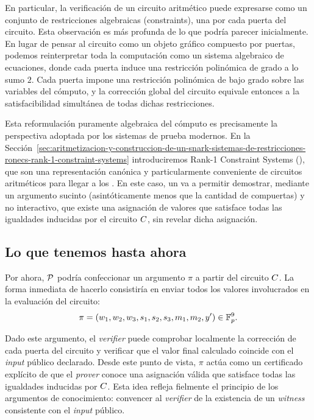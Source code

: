 En particular, la verificación de un circuito aritmético puede expresarse como un conjunto de restricciones algebraicas (constraints), una por cada puerta del circuito. Esta observación es más profunda de lo que podría parecer inicialmente. En lugar de pensar al circuito como un objeto gráfico compuesto por puertas, podemos reinterpretar toda la computación como un sistema algebraico de ecuaciones, donde cada puerta induce una restricción polinómica de grado a lo sumo $2$. Cada puerta impone una restricción polinómica de bajo grado sobre las variables del cómputo, y la corrección global del circuito equivale entonces a la satisfacibilidad simultánea de todas dichas restricciones.

Esta reformulación puramente algebraica del cómputo es precisamente la perspectiva adoptada por los sistemas de prueba modernos. En la Sección~\ref{sec:aritmetizacion-y-construccion-de-un-snark-sistemas-de-restricciones-ronecs-rank-1-constraint-systems} introduciremos Rank-1 Constraint Systems (\ROneCS), que son una representación canónica y particularmente conveniente de circuitos aritméticos para llegar a los \SNARK. En este caso, un \SNARK va a permitir demostrar, mediante un argumento sucinto (asintóticamente menos que la cantidad de compuertas) y no interactivo, que existe una asignación de valores que satisface todas las igualdades inducidas por el circuito $C$, sin revelar dicha asignación.

\subsection{Lo que tenemos hasta ahora}
\label{subsec:apendice-b-arithmetic-circuits-lo-que-tenemos-hasta-ahora}

Por ahora, $\mathcal{P}$ podría confeccionar un argumento $\pi$ a partir del circuito $C$. La forma inmediata de hacerlo consistiría en enviar todos los valores involucrados en la evaluación del circuito:
$$\pi = (w_1, w_2, w_3, s_1, s_2, s_3, m_1, m_2, y') \in \mathbb{F}_p^9.$$

Dado este argumento, el \textit{verifier} puede comprobar localmente la corrección de cada puerta del circuito y verificar que el valor final calculado coincide con el \textit{input} público declarado. Desde este punto de vista, $\pi$ actúa como un certificado explícito de que el \textit{prover} conoce una asignación válida que satisface todas las igualdades inducidas por $C$. Esta idea refleja fielmente el principio de los argumentos de conocimiento: convencer al \textit{verifier} de la existencia de un \textit{witness} consistente con el \textit{input} público.


